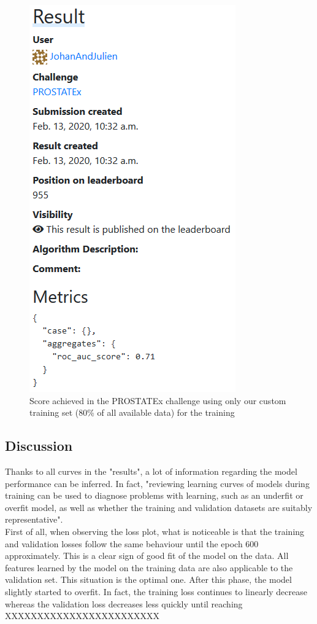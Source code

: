 \begin{figure}[!h]
\centering
\includegraphics[height=0.4\textheight, keepaspectratio=true]{./figures/paper_reproduction_results_challenge1.png}
\caption{Score achieved in the PROSTATEx challenge using only our custom training set (80\% of all available data) for the training}
\label{fig:paper_reprodution_results_challenge_1}
\end{figure}





\subsection{Discussion}
Thanks to all curves in the "results", a lot of information regarding the model performance can be inferred. In fact, "reviewing learning curves of models during training can be used to diagnose problems with learning, such as an underfit or overfit model, as well as whether the training and validation datasets are suitably representative"\cite{40}.\\
First of all, when observing the loss plot, what is noticeable is that the training and validation losses follow the same behaviour until the epoch 600 approximately. This is a clear sign of good fit of the model on the data. All features learned by the model on the training data are also applicable to the validation set. This situation is the optimal one. After this phase, the model slightly started to overfit. In fact, the training loss continues to linearly decrease whereas the validation loss decreases less quickly until reaching  XXXXXXXXXXXXXXXXXXXXXXXX\\

